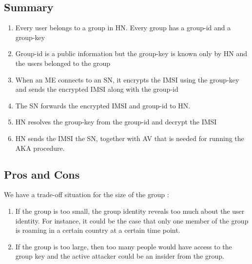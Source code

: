 \documentclass[portrait,a0]{a0poster}
\begin{document}
\begin{multicols}{2}
\subsection*{Summary}
\begin{enumerate}
\item Every user belongs to a group in HN. Every group has a group-id and a group-key 
\item Group-id is a public information but the group-key is known only by HN and the users belonged to the group
\item When an ME connects to an SN, it encrypts the IMSI using the group-key and sends the encrypted IMSI along with the group-id
\item The SN forwards the encrypted IMSI and group-id to HN. 
\item HN resolves the group-key from the group-id and decrypt the IMSI
\item HN sends the IMSI the SN, together with AV that is needed for running the AKA procedure.
\end{enumerate}

\subsection*{Pros and Cons}
We have a trade-off situation for the size of the group \citep{Ginzboorg_Niemi_2016}:
\begin{enumerate}
\item If the group is too small, the group identity reveals too much about the user identity. For instance, it could be the case that only one member of the group is roaming in a certain country at a certain time point.
\item If the group is too large, then too many people would have access to the group key and the active attacker could be an insider from the group.
\end{enumerate}


\end{multicols}
\end{document}
